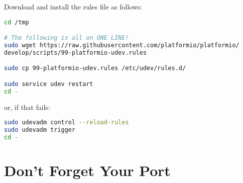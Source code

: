 Download and install the rules file as follows:

\begin{lstlisting}[language=bash]
cd /tmp

# The following is all on ONE LINE!
sudo wget https://raw.githubusercontent.com/platformio/platformio/
develop/scripts/99-platformio-udev.rules

sudo cp 99-platformio-udev.rules /etc/udev/rules.d/

sudo service udev restart
cd -
\end{lstlisting}

or, if that fails:

\begin{lstlisting}[language=bash]
sudo udevadm control --reload-rules
sudo udevadm trigger
cd -
\end{lstlisting}

\section{Don't Forget Your Port}
